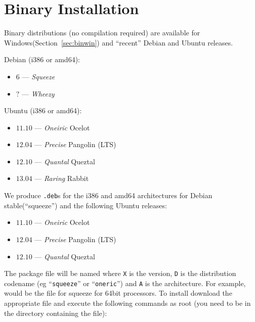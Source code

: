 %
%
%



\chapter{Binary Installation}\label{chap:bin}

Binary distributions (no compilation required) are available for Windows(Section~\ref{sec:binwin}) 
and ``recent'' Debian and Ubuntu releases.

Debian (i386 or amd64):
\begin{itemize}
 \item $6$ --- \emph{Squeeze}
 \item $?$ --- \emph{Wheezy}
\end{itemize}

Ubuntu (i386 or amd64):
\begin{itemize}
 \item $11.10$ --- \emph{Oneiric} Ocelot
 \item $12.04$ --- \emph{Precise} Pangolin (LTS)
 \item $12.10$ --- \emph{Quantal} Queztal 
 \item $13.04$ --- \emph{Raring} Rabbit
\end{itemize}


We produce \texttt{.deb}s for the i386 and amd64 architectures for Debian stable(``squeeze'') and the 
following Ubuntu releases:
\begin{itemize}
 \item $11.10$ --- \emph{Oneiric} Ocelot
 \item $12.04$ --- \emph{Precise} Pangolin (LTS)
 \item $12.10$ --- \emph{Quantal} Queztal 
\end{itemize}

The package file will be named  where \texttt{X} is the version, \texttt{D} 
is the distribution codename (eg ``\texttt{squeeze}'' or ``\texttt{oneric}'') and \texttt{A} is the architecture.
For example,  would be the file for squeeze for 64bit processors.
To install \esfinley download the appropriate  file and execute the following 
commands as root (you need to be in the directory containing the file):

